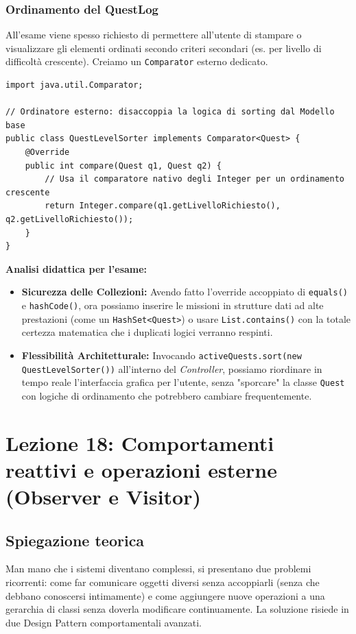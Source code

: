 \documentclass[12pt, a4paper]{article}
\begin{document}
\newpage

\subsubsection{Ordinamento del QuestLog}
All'esame viene spesso richiesto di permettere all'utente di stampare o visualizzare gli elementi ordinati secondo criteri secondari (es. per livello di difficoltà crescente). Creiamo un \texttt{Comparator} esterno dedicato.

\begin{verbatim}
import java.util.Comparator;

// Ordinatore esterno: disaccoppia la logica di sorting dal Modello base
public class QuestLevelSorter implements Comparator<Quest> {
    @Override
    public int compare(Quest q1, Quest q2) {
        // Usa il comparatore nativo degli Integer per un ordinamento crescente
        return Integer.compare(q1.getLivelloRichiesto(), q2.getLivelloRichiesto());
    }
}
\end{verbatim}

\textbf{Analisi didattica per l'esame:}
\begin{itemize}
    \item \textbf{Sicurezza delle Collezioni:} Avendo fatto l'override accoppiato di \texttt{equals()} e \texttt{hashCode()}, ora possiamo inserire le missioni in strutture dati ad alte prestazioni (come un \texttt{HashSet<Quest>}) o usare \texttt{List.contains()} con la totale certezza matematica che i duplicati logici verranno respinti.
    \item \textbf{Flessibilità Architetturale:} Invocando \texttt{activeQuests.sort(new QuestLevelSorter())} all'interno del \textit{Controller}, possiamo riordinare in tempo reale l'interfaccia grafica per l'utente, senza "sporcare" la classe \texttt{Quest} con logiche di ordinamento che potrebbero cambiare frequentemente.
\end{itemize}

\section{Lezione 18: Comportamenti reattivi e operazioni esterne (Observer e Visitor)}

\subsection{Spiegazione teorica}
Man mano che i sistemi diventano complessi, si presentano due problemi ricorrenti: come far comunicare oggetti diversi senza accoppiarli (senza che debbano conoscersi intimamente) e come aggiungere nuove operazioni a una gerarchia di classi senza doverla modificare continuamente. La soluzione risiede in due Design Pattern comportamentali avanzati.
\end{document}
